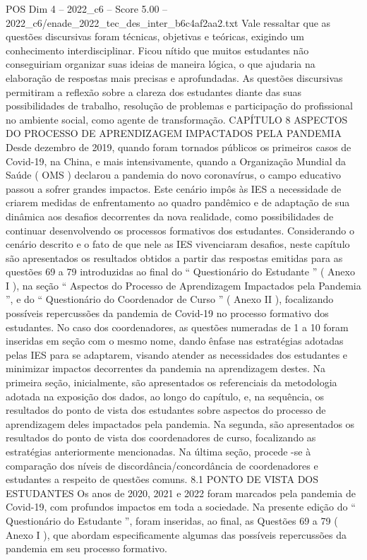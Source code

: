 \begin{textsample}{POS Dim 4 – 2022\_c6 – Score 5.00 – 2022\_c6/enade\_2022\_tec\_des\_inter\_b6c4af2aa2.txt}
Vale ressaltar que as questões discursivas foram técnicas, objetivas e teóricas, exigindo um conhecimento interdisciplinar.
Ficou nítido que muitos estudantes não conseguiriam organizar suas ideias de maneira lógica, o que ajudaria na elaboração de respostas mais precisas e aprofundadas.
As questões discursivas permitiram a reflexão sobre a clareza dos estudantes diante das suas possibilidades de trabalho, resolução de problemas e participação do profissional no ambiente social, como agente de transformação.
CAPÍTULO 8 ASPECTOS DO PROCESSO DE APRENDIZAGEM IMPACTADOS PELA PANDEMIA Desde dezembro de 2019, quando foram tornados públicos os primeiros casos de Covid-19, na China, e mais intensivamente, quando a Organização Mundial da Saúde ( OMS ) declarou a pandemia do novo coronavírus, o campo educativo passou a sofrer grandes impactos.
Este cenário impôs às IES a necessidade de criarem medidas de enfrentamento ao quadro pandêmico e de adaptação de sua dinâmica aos desafios decorrentes da nova realidade, como possibilidades de continuar desenvolvendo os processos formativos dos estudantes.
Considerando o cenário descrito e o fato de que nele as IES vivenciaram desafios, neste capítulo são apresentados os resultados obtidos a partir das respostas emitidas para as questões 69 a 79 introduzidas ao final do “ Questionário do Estudante ” ( Anexo I ), na seção “ Aspectos do Processo de Aprendizagem Impactados pela Pandemia ”, e do “ Questionário do Coordenador de Curso ” ( Anexo II ), focalizando possíveis repercussões da pandemia de Covid-19 no processo formativo dos estudantes.
No caso dos coordenadores, as questões numeradas de 1 a 10 foram inseridas em seção com o mesmo nome, dando ênfase nas estratégias adotadas pelas IES para se adaptarem, visando atender as necessidades dos estudantes e minimizar impactos decorrentes da pandemia na aprendizagem destes.
Na primeira seção, inicialmente, são apresentados os referenciais da metodologia adotada na exposição dos dados, ao longo do capítulo, e, na sequência, os resultados do ponto de vista dos estudantes sobre aspectos do processo de aprendizagem deles impactados pela pandemia.
Na segunda, são apresentados os resultados do ponto de vista dos coordenadores de curso, focalizando as estratégias anteriormente mencionadas.
Na última seção, procede -se à comparação dos níveis de discordância/concordância de coordenadores e estudantes a respeito de questões comuns. 8.1 PONTO DE VISTA DOS ESTUDANTES Os anos de 2020, 2021 e 2022 foram marcados pela pandemia de Covid-19, com profundos impactos em toda a sociedade.
Na presente edição do “ Questionário do Estudante ”, foram inseridas, ao final, as Questões 69 a 79 ( Anexo I ), que abordam especificamente algumas das possíveis repercussões da pandemia em seu processo formativo.

\end{textsample}
